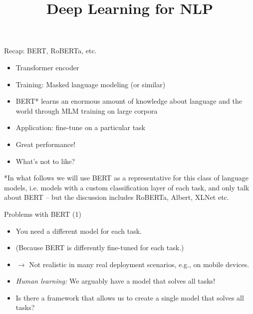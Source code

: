 \documentclass[11pt,compress,t,notes=noshow, xcolor=table]{beamer}
\title{Deep Learning for NLP}
\begin{document}


\begin{frame}{Recap: BERT, RoBERTa, etc.}

\vfill

  \begin{itemize}
\item Transformer encoder
\item Training: Masked language modeling (or similar)
\item BERT* learns an enormous amount of knowledge
about language and the world through MLM training on large corpora
\item Application: fine-tune on a particular task
\item Great performance!
\item \ques What's not to like?
    \end{itemize}

\vfill

*\scriptsize{In what follows we will use BERT as a representative for this class of language models, i.e. models with a custom classification layer of each task, and only talk about BERT -- but the discussion includes RoBERTa, Albert, XLNet etc.}

\end{frame}


\begin{frame}{Problems with BERT (1)}

\vfill

  \begin{itemize}
\item You need a different model for each task.
\item[] (Because BERT is differently fine-tuned for each task.)
\item[] $\to$ Not realistic in many real deployment scenarios, e.g., on mobile devices.
\item \textit{Human learning:} We arguably have a  model that solves all tasks!
\item \ques Is there a framework that allows us to create a single model that solves all tasks?
    \end{itemize}

\vfill

\end{frame}
\end{document}
